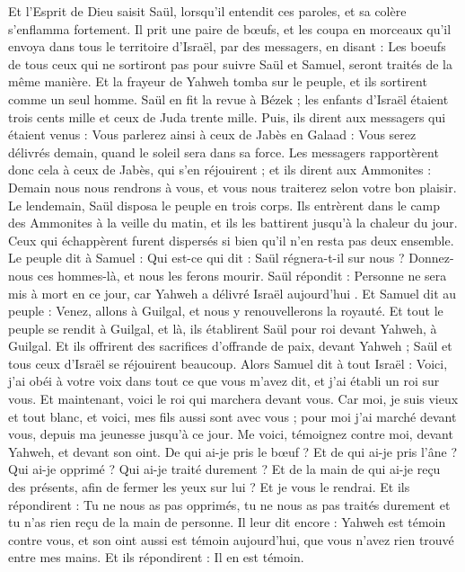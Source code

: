 \begin{multicols}{2}
Et l'Esprit de Dieu saisit Saül, lorsqu'il entendit ces paroles, et sa colère s’enflamma fortement.
Il prit une paire de bœufs, et les coupa en morceaux qu’il envoya dans tous le territoire d'Israël, par des messagers, en disant : Les boeufs de tous ceux qui ne sortiront pas pour suivre Saül et Samuel, seront traités de la même manière. Et la frayeur de Yahweh tomba sur le peuple, et ils sortirent comme un seul homme.
Saül en fit la revue à Bézek ; les enfants d'Israël étaient trois cents mille et ceux de Juda trente mille.
Puis, ils dirent aux messagers qui étaient venus : Vous parlerez ainsi à ceux de Jabès en Galaad : Vous serez délivrés demain, quand le soleil sera dans sa force. Les messagers rapportèrent donc cela à ceux de Jabès, qui s'en réjouirent ;
et ils dirent aux Ammonites : Demain nous nous rendrons à vous, et vous nous traiterez selon votre bon plaisir.
Le lendemain, Saül disposa le peuple en trois corps. Ils entrèrent dans le camp des Ammonites à la veille du matin, et ils les battirent jusqu’à la chaleur du jour. Ceux qui échappèrent furent dispersés si bien qu'il n'en resta pas deux ensemble.
Le peuple dit à Samuel : Qui est-ce qui dit : Saül régnera-t-il sur nous ? Donnez-nous ces hommes-là, et nous les ferons mourir.
Saül répondit : Personne ne sera mis à mort en ce jour, car Yahweh a délivré Israël aujourd'hui .
Et Samuel dit au peuple : Venez, allons à Guilgal, et nous y renouvellerons la royauté.
Et tout le peuple se rendit à Guilgal, et là, ils établirent Saül pour roi devant Yahweh, à Guilgal. Et ils offrirent des sacrifices d’offrande de paix, devant Yahweh ; Saül et tous ceux d'Israël se réjouirent beaucoup.
\VerseOne{}Alors Samuel dit à tout Israël : Voici, j'ai obéi à votre voix dans tout ce que vous m'avez dit, et j'ai établi un roi sur vous.
Et maintenant, voici le roi qui marchera devant vous. Car moi, je suis vieux et tout blanc, et voici, mes fils aussi sont avec vous ; pour moi j'ai marché devant vous, depuis ma jeunesse jusqu’à ce jour.
Me voici, témoignez contre moi, devant Yahweh, et devant son oint. De qui ai-je pris le bœuf ? Et de qui ai-je pris l'âne ? Qui ai-je opprimé ? Qui ai-je traité durement ? Et de la main de qui ai-je reçu des présents, afin de fermer les yeux sur lui ? Et je vous le rendrai.
Et ils répondirent : Tu ne nous as pas opprimés, tu ne nous as pas traités durement et tu n'as rien reçu de la main de personne.
Il leur dit encore : Yahweh est témoin contre vous, et son oint aussi est témoin aujourd'hui, que vous n'avez rien trouvé entre mes mains. Et ils répondirent : Il en est témoin.

\end{multicols}
